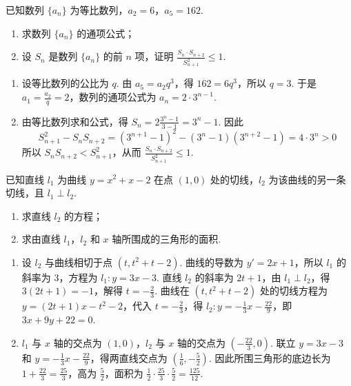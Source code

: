 \begin{problem}
已知数列 \(\{a_{n}\}\) 为等比数列，\(a_{2} = 6\)，\(a_{5} = 162\).

\begin{enumerate}
\item 求数列 \(\{a_{n}\}\) 的通项公式；
\item 设 \(S_{n}\) 是数列 \(\{a_{n}\}\) 的前 \(n\) 项，证明 \(\frac{S_{n} \cdot S_{n+2}}{S_{n+1}^{2}} \leqslant 1\).
\end{enumerate}
\end{problem}

\begin{solution}
\begin{enumerate}
\item 设等比数列的公比为 \(q\). 由 \(a_5=a_2q^3\)，得 \(162=6q^3\)，所以 \(q=3\). 于是 \(a_1=\frac{a_2}{q}=2\)，数列的通项公式为 \(a_n=2\cdot3^{n-1}\).
\item 由等比数列求和公式，得 \(S_n=2\frac{3^n-1}{3-1}=3^n-1\). 因此
\[
S_{n+1}^2-S_nS_{n+2}=(3^{n+1}-1)^2-(3^n-1)(3^{n+2}-1)=4\cdot3^n>0
\]
所以 \(S_nS_{n+2}<S_{n+1}^2\)，从而 \(\frac{S_n\cdot S_{n+2}}{S_{n+1}^2}\leqslant1\).
\end{enumerate}
\end{solution}

\begin{problem}
已知直线 \(l_{1}\) 为曲线 \(y = x^{2} + x - 2\) 在点 \((1,0)\) 处的切线，\(l_{2}\) 为该曲线的另一条切线，且 \(l_{1} \perp l_{2}\).

\begin{enumerate}
\item 求直线 \(l_{2}\) 的方程；
\item 求由直线 \(l_{1}\)，\(l_{2}\) 和 \(x\) 轴所围成的三角形的面积.
\end{enumerate}
\end{problem}

\begin{solution}
\begin{enumerate}
\item 设 \(l_2\) 与曲线相切于点 \((t,t^2+t-2)\). 曲线的导数为 \(y'=2x+1\)，所以 \(l_1\) 的斜率为 \(3\)，方程为 \(l_1:y=3x-3\). 直线 \(l_2\) 的斜率为 \(2t+1\)，由 \(l_1\perp l_2\)，得 \(3(2t+1)=-1\)，解得 \(t=-\frac{2}{3}\). 曲线在 \((t,t^2+t-2)\) 处的切线方程为 \(y=(2t+1)x-t^2-2\)，代入 \(t=-\frac{2}{3}\)，得 \(l_2:y=-\frac{1}{3}x-\frac{22}{9}\)，即 \(3x+9y+22=0\).
\item \(l_1\) 与 \(x\) 轴的交点为 \((1,0)\)，\(l_2\) 与 \(x\) 轴的交点为 \((-\frac{22}{3},0)\). 联立 \(y=3x-3\) 和 \(y=-\frac{1}{3}x-\frac{22}{9}\)，得两直线交点为 \((\frac{1}{6},-\frac{5}{2})\). 因此所围三角形的底边长为 \(1+\frac{22}{3}=\frac{25}{3}\)，高为 \(\frac{5}{2}\)，面积为 \(\frac{1}{2}\cdot\frac{25}{3}\cdot\frac{5}{2}=\frac{125}{12}\).
\end{enumerate}
\end{solution}

